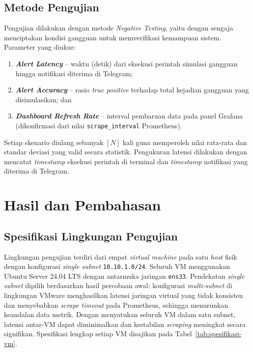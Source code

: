 \documentclass[10pt,twocolumn]{article}
\begin{document}
\subsection{Metode Pengujian}

Pengujian dilakukan dengan metode \textit{Negative Testing}, yaitu dengan sengaja menciptakan kondisi
gangguan untuk memverifikasi kemampuan sistem. Parameter yang diukur:
\begin{enumerate}[leftmargin=*, label=(\arabic*)]
  \item \textbf{\textit{Alert Latency}} -- waktu (detik) dari eksekusi perintah simulasi gangguan
        hingga notifikasi diterima di Telegram;
  \item \textbf{\textit{Alert Accuracy}} -- rasio \textit{true positive} terhadap total kejadian
        gangguan yang disimulasikan; dan
  \item \textbf{\textit{Dashboard Refresh Rate}} -- interval pembaruan data pada panel Grafana
        (dikonfirmasi dari nilai \texttt{scrape\_interval} Prometheus).
\end{enumerate}

Setiap skenario diulang sebanyak $[\mathit{N}]$ kali guna memperoleh nilai rata-rata dan standar
deviasi yang valid secara statistik. Pengukuran latensi dilakukan dengan mencatat \textit{timestamp}
eksekusi perintah di terminal dan \textit{timestamp} notifikasi yang diterima di Telegram.

\section{Hasil dan Pembahasan}

\subsection{Spesifikasi Lingkungan Pengujian}

Lingkungan pengujian terdiri dari empat \textit{virtual machine} pada satu \textit{host} fisik dengan
konfigurasi \textit{single subnet} \texttt{10.10.1.0/24}. Seluruh VM menggunakan Ubuntu Server 24.04
LTS dengan antarmuka jaringan \texttt{ens33}. Pendekatan \textit{single subnet} dipilih berdasarkan
hasil percobaan awal: konfigurasi \textit{multi-subnet} di lingkungan VMware menghasilkan latensi
jaringan virtual yang tidak konsisten dan menyebabkan \textit{scrape timeout} pada Prometheus,
sehingga menurunkan keandalan data metrik. Dengan menyatukan seluruh VM dalam satu subnet, latensi
antar-VM dapat diminimalkan dan kestabilan \textit{scraping} meningkat secara signifikan. Spesifikasi
lengkap setiap VM disajikan pada Tabel~\ref{tab:spesifikasi-vm}.
\end{document}
